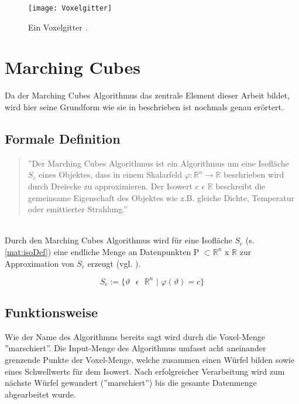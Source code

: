 \begin{figure}
	\centering
	\texttt{[image: Voxelgitter]}
	\caption{Ein Voxelgitter \citep{SeibtBak}.}
	\label{fig:Voxelgitter}
\end{figure}

\section{Marching Cubes}
Da der Marching Cubes Algorithmus das zentrale Element dieser Arbeit bildet, wird hier seine Grundform wie sie in \citep{MCAlgo} beschrieben ist nochmals genau erörtert. 
\subsection{Formale Definition}
\begin{quote}
	''Der Marching Cubes Algorithmus ist ein Algorithmus um eine Isofläche $S_{c}$ eines Objektes, dass in einem Skalarfeld  $\varphi : \mathbb{R}^{n} \rightarrow \mathbb{R }$ beschrieben wird durch Dreiecke zu approximieren. Der Isowert c $\epsilon$ $ \mathbb{ R} $ beschreibt die gemeinsame Eigenschaft des Objektes wie z.B. gleiche Dichte, Temperatur oder emittierter Strahlung.''
\end{quote} \citep{WollmannBak}\\

\noindent Durch den Marching Cubes Algorithmus wird für eine Isofläche $S_{c}$ (s. \ref{mat:isoDef})
eine endliche Menge an Datenpunkten P $\subset \mathbb{R}^{n} \text{ x } \mathbb{R}$ zur Approximation von $S_{c}$ erzeugt (vgl. \citep{VisualHandbook}).

\begin{equation}
\label{mat:isoDef}
S_{c} := \{ \vartheta \text{ } \epsilon \text{ } \mathbb{R}^{n} \text{ | } \varphi(\vartheta) = c\}
\end{equation} 
\subsection{Funktionsweise}

Wie der Name des Algorithmus bereits sagt wird durch die Voxel-Menge ''marschiert''. Die Input-Menge des Algorithmus umfasst acht aneinander grenzende Punkte der Voxel-Menge, welche zusammen einen Würfel bilden sowie eines Schwellwerts für dem Isowert. Nach erfolgreicher Verarbeitung wird zum nächste Würfel gewandert (''marschiert'') bis die gesamte Datenmenge abgearbeitet wurde. 
